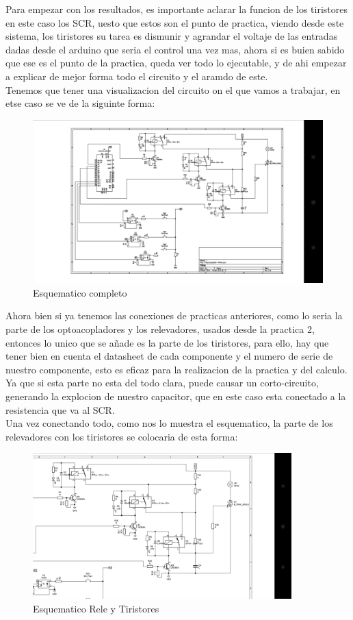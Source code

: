 \documentclass[12pt,a4paper]{article}
\begin{document}
{Para empezar con los resultados, es importante aclarar la funcion de los tiristores en este caso los SCR, uesto que estos son el punto de practica, viendo desde este sistema, los tiristores su tarea es dismunir y agrandar el voltaje de las entradas dadas desde el arduino que seria el control una vez mas, ahora si es buien sabido que ese es el punto de la practica, queda ver todo lo ejecutable, y de ahi empezar a explicar de mejor forma todo el circuito y el aramdo de este.\\
Tenemos que tener una visualizacion del circuito on el que vamos a trabajar, en etse caso se ve de la siguinte forma:\\
\begin{figure}[hbtp]
\centering
\includegraphics[width=12cm]{Diagrama.png}
\caption{Esquematico completo}
\end{figure}

Ahora bien si ya tenemos las conexiones de practicas anteriores, como lo seria la parte de los optoacopladores y los relevadores, usados desde la practica 2, entonces lo unico que se añade es la parte de los tiristores, para ello, hay que tener bien en cuenta el datasheet de cada componente y el numero de serie de nuestro componente, esto es eficaz para la realizacion de la practica y del calculo. Ya que si esta parte no esta del todo clara, puede causar un corto-circuito, generando la explocion de nuestro capacitor, que en este caso esta conectado a la resistencia que va al SCR.\\
Una vez conectando todo, como nos lo muestra el esquematico, la parte de los relevadores con los tiristores se colocaria de esta forma:\\

\begin{figure}[hbtp]
\centering
\includegraphics[width=10cm]{Tiri.png}
\caption{Esquematico Rele y Tiristores}
\end{figure}

}
\end{document}
